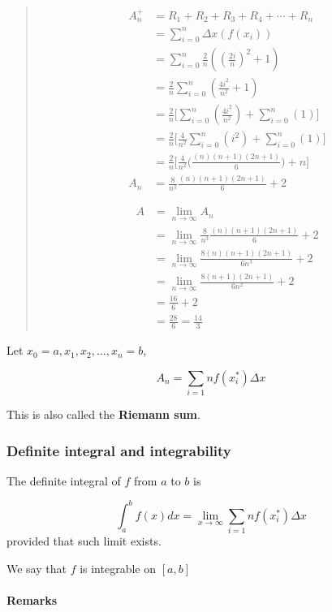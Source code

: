 \documentclass[
]{article}
\begin{document}
\begin{quote}
\begin{align*}
A_n^+ &= R_1 + R_2 + R_3 + R_4 + \cdots + R_n\\
&= \sum_{i=0}^n \Delta x (f(x_i))\\
&= \sum_{i=0}^n \frac{2}{n} ((\frac{2i}{n})^2 +1)\\
&= \frac{2}{n} \sum_{i=0}^n (\frac{4i^2}{n^2} +1)\\
&= \frac{2}{n} \Big[\sum_{i=0}^n (\frac{4i^2}{n^2}) + \sum_{i=0}^n(1)\Big]\\
&= \frac{2}{n} \Big[\frac{4}{n^2}\sum_{i=0}^n (i^2) + \sum_{i=0}^n(1)\Big]\\
&= \frac{2}{n} \Big[\frac{4}{n^2} \Big(\frac{(n)(n+1)(2n+1)}{6}\Big)+n\Big]\\
A_n&= \frac{8}{n^3} \frac{(n)(n+1)(2n+1)}{6} +2

\end{align*}

\begin{align*}
A &= \lim_{n \to\infty} A_n\\
&= \lim_{n \to \infty}  \frac{8}{n^3} \frac{(n)(n+1)(2n+1)}{6} + 2\\
&= \lim_{n \to \infty} \frac{8(n)(n+1)(2n+1)}{6n^3} +2\\
&= \lim_{n \to \infty} \frac{8(n+1)(2n+1)}{6n^2} +2\\
&= \frac{16}{6} +2\\
&= \frac{28}{6} = \frac{14}{3}
\end{align*}
\end{quote}

Let \(x_0=a, x_1,x_2, \ldots, x_n = b\),

\[A_n = \sum_{i=1}{n}f(x_i^*)\Delta x \]

This is also called the \textbf{Riemann sum}.

\hypertarget{definite-integral-and-integrability}{%
\subsubsection{Definite integral and
integrability}\label{definite-integral-and-integrability}}

The definite integral of \(f\) from \(a\) to \(b\) is

\[ \int_a^b f(x)dx = \lim_{x\to\infty}\sum_{i=1}{n}f(x_i^*)\Delta x \]
provided that such limit exists.

We say that \(f\) is integrable on \([a,b]\)

\hypertarget{remarks}{%
\paragraph{Remarks}\label{remarks}}
\end{document}
